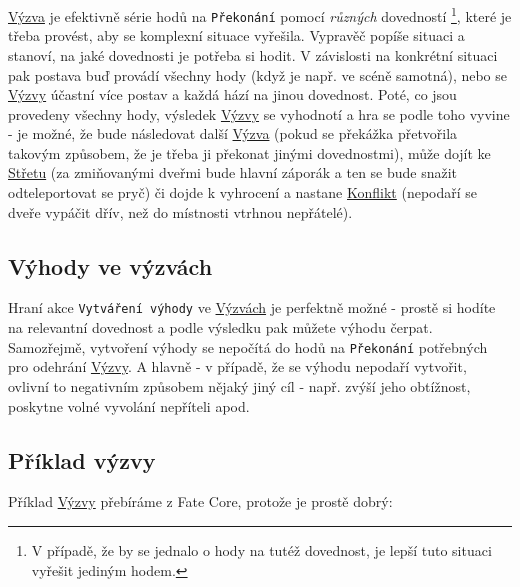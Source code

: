 \underline{Výzva} je efektivně série hodů na \texttt{Překonání} pomocí \textit{různých} dovedností \footnote{V případě, že by se jednalo o hody na tutéž dovednost, je lepší tuto situaci vyřešit jediným hodem.}, které je třeba provést, aby se komplexní situace vyřešila. Vypravěč popíše situaci a stanoví, na jaké dovednosti je potřeba si hodit. V závislosti na konkrétní situaci pak postava buď provádí všechny hody (když je např. ve scéně samotná), nebo se \underline{Výzvy} účastní více postav a každá hází na jinou dovednost. Poté, co jsou provedeny všechny hody, výsledek \underline{Výzvy} se vyhodnotí a hra se podle toho vyvine - je možné, že bude následovat další \underline{Výzva} (pokud se překážka přetvořila takovým způsobem, že je třeba ji překonat jinými dovednostmi), může dojít ke \underline{Střetu} (za zmiňovanými dveřmi bude hlavní záporák a ten se bude snažit odteleportovat se pryč) či dojde k vyhrocení a nastane \underline{Konflikt} (nepodaří se dveře vypáčit dřív, než do místnosti vtrhnou nepřátelé).

\subsection{Výhody ve výzvách}
\label{sec:výhody-výzvy}

Hraní akce \texttt{Vytváření výhody} ve \underline{Výzvách} je perfektně možné - prostě si hodíte na relevantní dovednost a podle výsledku pak můžete výhodu čerpat. Samozřejmě, vytvoření výhody se nepočítá do hodů na \texttt{Překonání} potřebných pro odehrání \underline{Výzvy}. A hlavně - v případě, že se výhodu nepodaří vytvořit, ovlivní to negativním způsobem nějaký jiný cíl - např. zvýší jeho obtížnost, poskytne volné vyvolání nepříteli apod.

\subsection{Příklad výzvy}
\label{sec:příklad-výzvy}

Příklad \underline{Výzvy} přebíráme z Fate Core, protože je prostě dobrý:

